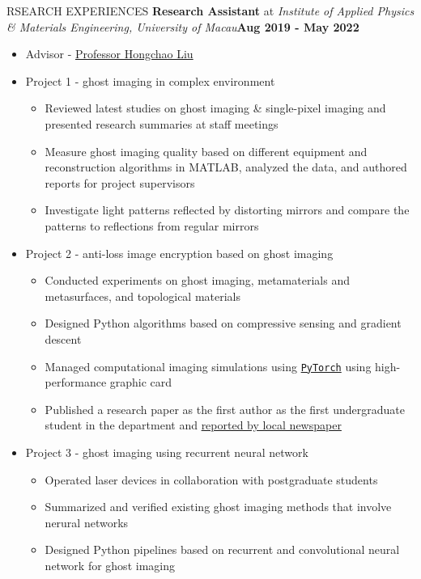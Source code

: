 \documentclass[10pt]{article} %
\begin{document}
\begin{section}{RSEARCH EXPERIENCES}
\textbf{Research Assistant} at \textit{Institute of Applied Physics \& Materials Engineering, University of Macau}\hfill \textbf{Aug 2019 - May 2022} 
\begin{itemize}[leftmargin=1.5em]
    \item Advisor - \href{mailto:hcliu@um.edu.mo}{Professor Hongchao Liu}
    \item Project 1 - ghost imaging in complex environment %
    \begin{itemize}[leftmargin=1.5em]
        \item Reviewed latest studies on ghost imaging \& single-pixel imaging and presented research summaries at staff meetings
        \item Measure ghost imaging quality based on different equipment and reconstruction algorithms in MATLAB, analyzed the data, and authored reports for project supervisors
        \item Investigate light patterns reflected by distorting mirrors and compare the patterns to reflections from regular mirrors
    \end{itemize}
    \item Project 2 - anti-loss image encryption based on ghost imaging %
    \begin{itemize}[leftmargin=1.5em]
        \item Conducted experiments on ghost imaging, metamaterials and metasurfaces, and topological materials
        \item Designed Python algorithms based on compressive sensing and gradient descent
        \item Managed computational imaging simulations using \href{https://pytorch.org/}{\texttt{PyTorch}} using high-performance graphic card
        \item Published a research paper as the first author as the first undergraduate student in the department and \href{https://www.tdm.com.mo/en/news-detail/683438?isvideo=false&lang=en&category=all}{reported by local newspaper} 
    \end{itemize}
    \item Project 3 - ghost imaging using recurrent neural network %
    \begin{itemize}[leftmargin=1.5em]
        \item Operated laser devices in collaboration with postgraduate students
        \item Summarized and verified existing ghost imaging methods that involve nerural networks
        \item Designed Python pipelines based on recurrent and convolutional neural network for ghost imaging 
    \end{itemize}
\end{itemize}

\end{section}
\end{document}

